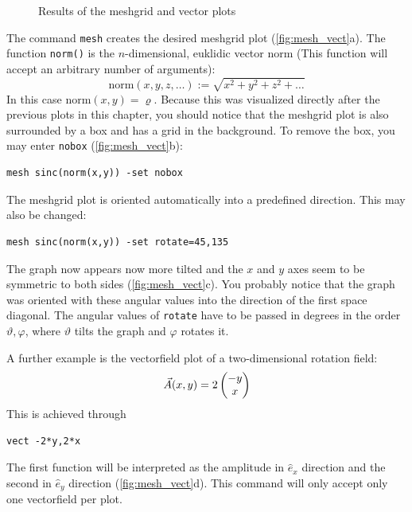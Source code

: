 \documentclass[DIV=14,headsepline,footsepline]{scrbook}
\begin{document}
\begin{figure}[p]
					\caption{Results of the meshgrid and vector plots}
					\label{fig:mesh_vect}
				\end{figure}
				The command \verb+mesh+ creates the desired meshgrid plot (\autoref{fig:mesh_vect}a). The function \verb+norm()+ is the $n$-dimensional, euklidic vector norm (This function will accept an arbitrary number of arguments):
				\begin{equation*}
					\text{norm}(x,y,z,\ldots) := \sqrt{x^2+y^2+z^2+\ldots}
				\end{equation*}
				In this case $\text{norm}(x,y) = \varrho$. Because this was visualized directly after the previous plots in this chapter, you should notice that the meshgrid plot is also surrounded by a box and has a grid in the background. To remove the box, you may enter \verb+nobox+ (\autoref{fig:mesh_vect}b):
				\begin{lstlisting}
mesh sinc(norm(x,y)) -set nobox
				\end{lstlisting}
				
				The meshgrid plot is oriented automatically into a predefined direction. This may also be changed:
				\begin{lstlisting}
mesh sinc(norm(x,y)) -set rotate=45,135
				\end{lstlisting}
				The graph now appears now more tilted and the $x$ and $y$ axes seem to be symmetric to both sides (\autoref{fig:mesh_vect}c). You probably notice that the graph was oriented with these angular values into the direction of the first space diagonal. The angular values of \verb+rotate+ have to be passed in degrees in the order $\vartheta,\varphi$, where $\vartheta$ tilts the graph and $\varphi$ rotates it.
				
				A further example is the vectorfield plot of a two-dimensional rotation field:
				\[\vec A(x,y) = 2\begin{pmatrix} -y\\x \end{pmatrix}\]
				This is achieved through
				\begin{lstlisting}
vect -2*y,2*x
				\end{lstlisting}
				The first function will be interpreted as the amplitude in $\hat e_x$ direction and the second in $\hat e_y$ direction (\autoref{fig:mesh_vect}d). This command will only accept only one vectorfield per plot.
				
\end{document}
